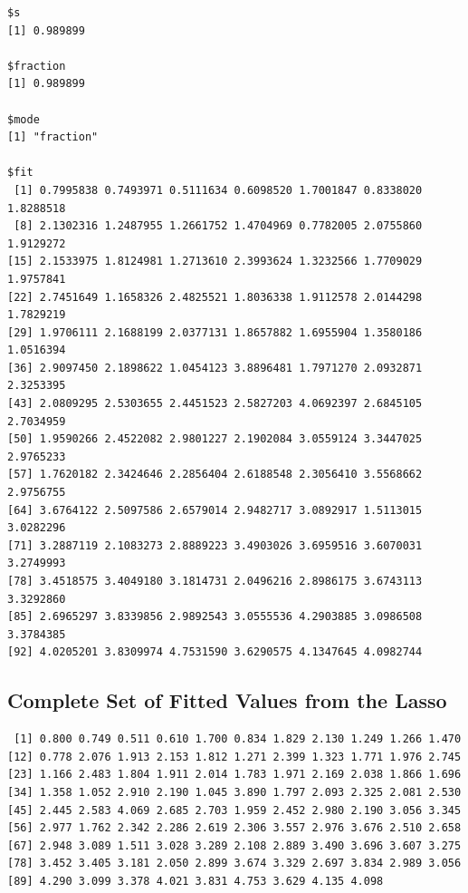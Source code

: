 \documentclass[]{book}
\newenvironment{Shaded}{\begin{snugshade}}{\end{snugshade}}
\newcommand{\KeywordTok}[1]{\textcolor[rgb]{0.13,0.29,0.53}{\textbf{#1}}}
\newcommand{\DecValTok}[1]{\textcolor[rgb]{0.00,0.00,0.81}{#1}}
\newcommand{\OperatorTok}[1]{\textcolor[rgb]{0.81,0.36,0.00}{\textbf{#1}}}
\newcommand{\NormalTok}[1]{#1}
\theoremstyle{definition}
\theoremstyle{definition}
\theoremstyle{definition}
\theoremstyle{remark}
\begin{document}
\begin{verbatim}
$s
[1] 0.989899

$fraction
[1] 0.989899

$mode
[1] "fraction"

$fit
 [1] 0.7995838 0.7493971 0.5111634 0.6098520 1.7001847 0.8338020 1.8288518
 [8] 2.1302316 1.2487955 1.2661752 1.4704969 0.7782005 2.0755860 1.9129272
[15] 2.1533975 1.8124981 1.2713610 2.3993624 1.3232566 1.7709029 1.9757841
[22] 2.7451649 1.1658326 2.4825521 1.8036338 1.9112578 2.0144298 1.7829219
[29] 1.9706111 2.1688199 2.0377131 1.8657882 1.6955904 1.3580186 1.0516394
[36] 2.9097450 2.1898622 1.0454123 3.8896481 1.7971270 2.0932871 2.3253395
[43] 2.0809295 2.5303655 2.4451523 2.5827203 4.0692397 2.6845105 2.7034959
[50] 1.9590266 2.4522082 2.9801227 2.1902084 3.0559124 3.3447025 2.9765233
[57] 1.7620182 2.3424646 2.2856404 2.6188548 2.3056410 3.5568662 2.9756755
[64] 3.6764122 2.5097586 2.6579014 2.9482717 3.0892917 1.5113015 3.0282296
[71] 3.2887119 2.1083273 2.8889223 3.4903026 3.6959516 3.6070031 3.2749993
[78] 3.4518575 3.4049180 3.1814731 2.0496216 2.8986175 3.6743113 3.3292860
[85] 2.6965297 3.8339856 2.9892543 3.0555536 4.2903885 3.0986508 3.3784385
[92] 4.0205201 3.8309974 4.7531590 3.6290575 4.1347645 4.0982744
\end{verbatim}

\subsection{Complete Set of Fitted Values from the
Lasso}\label{complete-set-of-fitted-values-from-the-lasso}

\begin{Shaded}
\end{Shaded}

\begin{verbatim}
 [1] 0.800 0.749 0.511 0.610 1.700 0.834 1.829 2.130 1.249 1.266 1.470
[12] 0.778 2.076 1.913 2.153 1.812 1.271 2.399 1.323 1.771 1.976 2.745
[23] 1.166 2.483 1.804 1.911 2.014 1.783 1.971 2.169 2.038 1.866 1.696
[34] 1.358 1.052 2.910 2.190 1.045 3.890 1.797 2.093 2.325 2.081 2.530
[45] 2.445 2.583 4.069 2.685 2.703 1.959 2.452 2.980 2.190 3.056 3.345
[56] 2.977 1.762 2.342 2.286 2.619 2.306 3.557 2.976 3.676 2.510 2.658
[67] 2.948 3.089 1.511 3.028 3.289 2.108 2.889 3.490 3.696 3.607 3.275
[78] 3.452 3.405 3.181 2.050 2.899 3.674 3.329 2.697 3.834 2.989 3.056
[89] 4.290 3.099 3.378 4.021 3.831 4.753 3.629 4.135 4.098
\end{verbatim}
\end{document}
